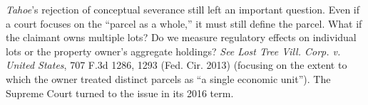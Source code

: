 
\textit{Tahoe}'s rejection of conceptual severance still left an important
question. Even if a court focuses on the ``parcel as a whole,'' it must still
define the parcel. What if the claimant owns multiple lots? Do we measure
regulatory effects on individual lots or the property owner's aggregate
holdings? \textit{See Lost Tree Vill. Corp. v. United States}, 707 F.3d 1286,
1293 (Fed. Cir. 2013) (focusing on the extent to which the owner treated
distinct parcels as ``a single economic unit''). The Supreme Court turned to the
issue in its 2016 term. 

